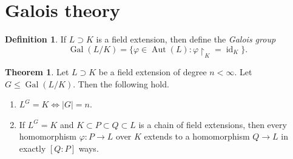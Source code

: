 \documentclass[10pt,letterpaper,cm]{nupset}
\theoremstyle{definition}
\newtheorem*{definition}{Definition}
\newtheorem{theorem}{Theorem}
\newcommand{\1}{\mathbf{1}}
\newcommand{\0}{\vec 0}
\DeclareMathOperator{\id}{id}
\DeclareMathOperator{\gal}{Gal}
\DeclareMathOperator{\aut}{Aut}
\begin{document}
\section{Galois theory}

\begin{definition}
If $L \supset K$ is a field extension, then define the \textit{Galois group} $$\gal(L/K) = \{\varphi \in \aut(L) : \varphi\restriction_K = \id_K\}.    $$
\end{definition}

\begin{theorem}
Let $L \supset K$ be a field extension of degree $n<\infty$. Let $G \leq  \gal(L/K)$. Then the following hold.
\begin{enumerate}[label=(\alph*)]
\item $L^G = K \iff |G| = n$.
\item  If $L^G = K$ and $K \subset P \subset Q \subset L$ is a chain of field extensions, then every homomorphism $\varphi : P \to L$ over $K$ extends to a homomorphism $Q \to L$ in exactly $[Q:P]$ ways. 
\end{enumerate}
\end{theorem}
\end{document}
